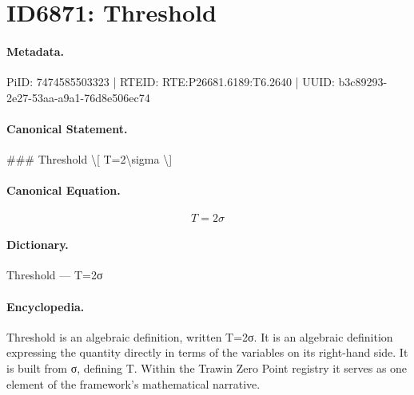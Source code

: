 \section*{ID6871: Threshold}
\paragraph{Metadata.}
PiID: 7474585503323 | RTEID: RTE:P26681.6189:T6.2640 | UUID: b3c89293-2e27-53aa-a9a1-76d8e506ec74

\paragraph{Canonical Statement.}
\#\#\# Threshold \textbackslash{}[ T=2\textbackslash{}sigma \textbackslash{}]

\paragraph{Canonical Equation.}
\[
T=2\sigma
\]

\paragraph{Dictionary.}
Threshold — T=2σ

\paragraph{Encyclopedia.}
Threshold is an algebraic definition, written T=2σ. It is an algebraic definition expressing the quantity directly in terms of the variables on its right-hand side. It is built from σ, defining T. Within the Trawin Zero Point registry it serves as one element of the framework's mathematical narrative.
